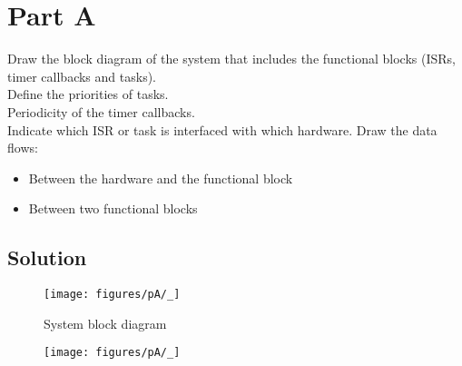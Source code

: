 \section*{Part A}

Draw the block diagram of the system that includes the functional blocks (ISRs, timer callbacks and tasks). \\
Define the priorities of tasks. \\
Periodicity of the timer callbacks. \\
Indicate which ISR or task is interfaced with which hardware.
Draw the data flows:
\begin{itemize}[noitemsep, topsep=0pt]
    \item Between the hardware and the functional block
    \item Between two functional blocks
\end{itemize}

\vspace*{-1em}
\subsection*{Solution}
\vspace*{-0.5em}

\begin{figure*}[ht]
    \centering
    \texttt{[image: figures/pA/\_]}
    \vspace*{-3em}
    \caption{System block diagram}
\end{figure*}
\vspace*{-1em}
\begin{figure*}[ht]
    \centering
    \texttt{[image: figures/pA/\_]}
\end{figure*}
